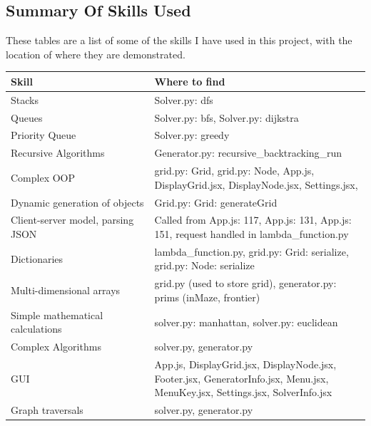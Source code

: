 \documentclass[titlepage]{article}
\begin{document}
\subsection{Summary Of Skills Used}
These tables are a list of some of the skills I have used in this project, with the location of where they are demonstrated.
\begin{center}
    
    \begin{tabular}{ |p{0.4\linewidth}|p{0.8\linewidth}| }
        \hline
        Skill & Where to find \\
        \hline
        \hline
        Stacks & Solver.py: dfs \\
        \hline
        Queues & Solver.py: bfs, Solver.py: dijkstra\\
        \hline
        Priority Queue & Solver.py: greedy \\
        \hline
        Recursive Algorithms & Generator.py: recursive\_backtracking\_run \\
        \hline
        Complex OOP & grid.py: Grid, grid.py: Node, App.js, DisplayGrid.jsx, DisplayNode.jsx, Settings.jsx,  \\
        \hline
        Dynamic generation of objects & Grid.py: Grid: generateGrid \\
        \hline
        Client-server model, parsing JSON & Called from App.js: 117, App.js: 131, App.js: 151, request handled in lambda\_function.py \\
        \hline
        Dictionaries & lambda\_function.py, grid.py: Grid: serialize, grid.py: Node: serialize \\
        \hline
        Multi-dimensional arrays & grid.py (used to store grid), generator.py: prims (inMaze, frontier) \\
        \hline 
        Simple mathematical calculations & solver.py: manhattan, solver.py: euclidean \\
        \hline
        Complex Algorithms & solver.py, generator.py \\
        \hline
        GUI & App.js, DisplayGrid.jsx, DisplayNode.jsx, Footer.jsx, GeneratorInfo.jsx, Menu.jsx, MenuKey.jsx, Settings.jsx, SolverInfo.jsx \\
        \hline
        Graph traversals & solver.py, generator.py \\
        \hline
    \end{tabular}

\end{center}
\end{document}

